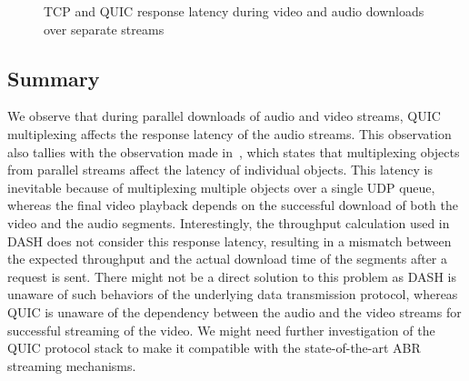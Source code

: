 \begin{figure}[!ht]
	\captionsetup[subfigure]{}
	\begin{center}
           		\hfill
	\end{center}
	\label{fig:chap03s2:dashcompres}
	\caption{\acs{TCP} and \acs{QUIC} response latency during video and audio downloads over separate streams}
\end{figure}


\subsection{Summary}
We observe that during parallel downloads of audio and video streams, \ac{QUIC} multiplexing affects the response latency of the audio streams. This observation also tallies with the observation made in~\cite{kakhki2019taking}, which states that multiplexing objects from parallel streams affect the latency of individual objects. This latency is inevitable because of multiplexing multiple objects over a single \ac{UDP} queue, whereas the final video playback depends on the successful download of both the video and the audio segments. Interestingly, the throughput calculation used in \ac{DASH} does not consider this response latency, resulting in a mismatch between the expected throughput and the actual download time of the segments after a request is sent. There might not be a direct solution to this problem as \ac{DASH} is unaware of such behaviors of the underlying data transmission protocol, whereas \ac{QUIC} is unaware of the dependency between the audio and the video streams for successful streaming of the video. We might need further investigation of the \ac{QUIC} protocol stack to make it compatible with the state-of-the-art \ac{ABR} streaming mechanisms.

